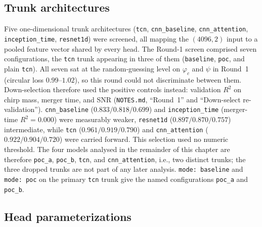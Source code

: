 \subsection{Trunk architectures}
\label{sec:phicpsi:trunks}

Five one-dimensional trunk architectures (\texttt{tcn}, \texttt{cnn\_baseline}, \texttt{cnn\_attention}, \texttt{inception\_time}, \texttt{resnet1d}) were screened, all mapping the $(4096,2)$ input to a pooled feature vector shared by every head.
The Round-1 screen comprised seven configurations, the \texttt{tcn} trunk appearing in three of them (\texttt{baseline}, \texttt{poc}, and plain \texttt{tcn}).
All seven sat at the random-guessing level on $\varphi_c$ and $\psi$ in Round~1 (circular loss $0.99$--$1.02$), so this round could not discriminate between them.
Down-selection therefore used the positive controls instead: validation $R^2$ on chirp mass, merger time, and SNR (\texttt{NOTES.md}, ``Round~1'' and ``Down-select re-validation'').
\texttt{cnn\_baseline} ($0.833 / 0.818 / 0.699$) and \texttt{inception\_time} (merger-time $R^2 = 0.000$) were measurably weaker, \texttt{resnet1d} ($0.897 / 0.870 / 0.757$) intermediate, while \texttt{tcn} ($0.961 / 0.919 / 0.790$) and \texttt{cnn\_attention} ($0.922 / 0.904 / 0.720$) were carried forward.
This selection used no numeric threshold.
The four models analysed in the remainder of this chapter are therefore \texttt{poc\_a}, \texttt{poc\_b}, \texttt{tcn}, and \texttt{cnn\_attention}, i.e., two distinct trunks; the three dropped trunks are not part of any later analysis.
\texttt{mode: baseline} and \texttt{mode: poc} on the primary \texttt{tcn} trunk give the named configurations \texttt{poc\_a} and \texttt{poc\_b}.

\subsection{Head parameterizations}
\label{sec:phicpsi:heads}


